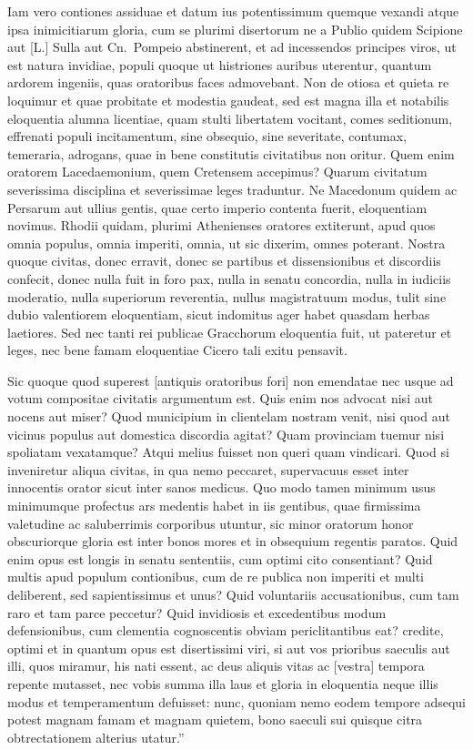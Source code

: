 Iam vero contiones assiduae et datum ius potentissimum quemque vexandi atque ipsa inimicitiarum gloria, cum se plurimi disertorum ne a Publio quidem Scipione aut [L.] Sulla aut Cn.~Pompeio abstinerent, et ad incessendos principes viros, ut est natura invidiae, populi quoque ut histriones auribus uterentur, quantum ardorem ingeniis, quas oratoribus faces admovebant. Non de otiosa et quieta re loquimur et quae probitate et modestia gaudeat, sed est magna illa et notabilis eloquentia alumna licentiae, quam stulti libertatem vocitant, comes seditionum, effrenati populi incitamentum, sine obsequio, sine severitate, contumax, temeraria, adrogans, quae in bene constitutis civitatibus non oritur. Quem enim oratorem Lacedaemonium, quem Cretensem accepimus? Quarum civitatum severissima disciplina et severissimae leges traduntur. Ne Macedonum quidem ac Persarum aut ullius gentis, quae certo imperio contenta fuerit, eloquentiam novimus. Rhodii quidam, plurimi Athenienses oratores extiterunt, apud quos omnia populus, omnia imperiti, omnia, ut sic dixerim, omnes poterant. Nostra quoque civitas, donec erravit, donec se partibus et dissensionibus et discordiis confecit, donec nulla fuit in foro pax, nulla in senatu concordia, nulla in iudiciis moderatio, nulla superiorum reverentia, nullus magistratuum modus, tulit sine dubio valentiorem eloquentiam, sicut indomitus ager habet quasdam herbas laetiores. Sed nec tanti rei publicae Gracchorum eloquentia fuit, ut pateretur et leges, nec bene famam eloquentiae Cicero tali exitu pensavit.

Sic quoque quod superest [antiquis oratoribus fori] non emendatae nec usque ad votum compositae civitatis argumentum est. Quis enim nos advocat nisi aut nocens aut miser? Quod municipium in clientelam nostram venit, nisi quod aut vicinus populus aut domestica discordia agitat? Quam provinciam tuemur nisi spoliatam vexatamque? Atqui melius fuisset non queri quam vindicari. Quod si inveniretur aliqua civitas, in qua nemo peccaret, supervacuus esset inter innocentis orator sicut inter sanos medicus. Quo modo tamen minimum usus minimumque profectus ars medentis habet in iis gentibus, quae firmissima valetudine ac saluberrimis corporibus utuntur, sic minor oratorum honor obscuriorque gloria est inter bonos mores et in obsequium regentis paratos. Quid enim opus est longis in senatu sententiis, cum optimi cito consentiant? Quid multis apud populum contionibus, cum de re publica non imperiti et multi deliberent, sed sapientissimus et unus? Quid voluntariis accusationibus, cum tam raro et tam parce peccetur? Quid invidiosis et excedentibus modum defensionibus, cum clementia cognoscentis obviam periclitantibus eat? credite, optimi et in quantum opus est disertissimi viri, si aut vos prioribus saeculis aut illi, quos miramur, his nati essent, ac deus aliquis vitas ac [vestra] tempora repente mutasset, nec vobis summa illa laus et gloria in eloquentia neque illis modus et temperamentum defuisset: nunc, quoniam nemo eodem tempore adsequi potest magnam famam et magnam quietem, bono saeculi sui quisque citra obtrectationem alterius utatur.''
